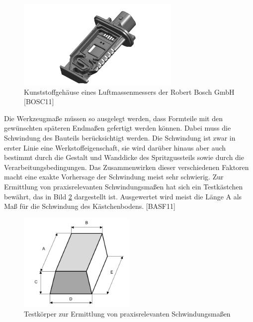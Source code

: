 \noindent 
\begin{figure}[H]
  \centerline{\includegraphics[width=0.7\textwidth]{Kapitel7/Bilder/image9}}
  \caption{Kunststoffgehäuse eines Luftmassenmessers der Robert Bosch GmbH [BOSC11]}
  \label{fig:Kunststoffgehäuse}
\end{figure}

\noindent Die Werkzeugma{\ss}e m\"{u}ssen so ausgelegt werden, dass Formteile mit den gew\"{u}nschten sp\"{a}teren Endma{\ss}en gefertigt werden k\"{o}nnen. Dabei muss die Schwindung des Bauteils ber\"{u}cksichtigt werden. Die Schwindung ist zwar in erster Linie eine Werkstoffeigenschaft, sie wird dar\"{u}ber hinaus aber auch bestimmt durch die Gestalt und Wanddicke des Spritzgussteils sowie durch die Verarbeitungsbedingungen. Das Zusammenwirken dieser verschiedenen Faktoren macht eine exakte Vorhersage der Schwindung meist sehr schwierig. Zur Ermittlung von praxisrelevanten Schwindungsma{\ss}en hat sich ein Testk\"{a}stchen bew\"{a}hrt, das in Bild \ref{fig:Testkörper} dargestellt ist. Ausgewertet wird meist die L\"{a}nge A als Ma{\ss} f\"{u}r die Schwindung des K\"{a}stchenbodens. [BASF11]

\noindent 
\begin{figure}[H]
  \centerline{\includegraphics[width=0.5\textwidth]{Kapitel7/Bilder/image10}}
  \caption{Testkörper zur Ermittlung von praxisrelevanten Schwindungsma{\ss}en}
  \label{fig:Testkörper}
\end{figure}

